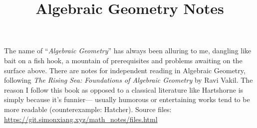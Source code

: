\documentclass[fontsize=9pt]{article}
\title{Algebraic Geometry Notes}
\begin{document}
\maketitle
The name of ``\emph{Algebraic Geometry}'' has always been alluring to me, dangling like bait on a fish hook, a mountain of prerequisites and problems awaiting on the surface above. There are notes for independent reading in Algebraic Geometry, following \emph{The Rising Sea: Foundations of Algebraic Geometry} by Ravi Vakil. The reason I follow this book as opposed to a classical literature like Hartshorne is simply because it's funnier— usually humorous or entertaining works tend to be more readable (counterexample: Hatcher). Source files: \url{https://git.simonxiang.xyz/math_notes/files.html}

\tableofcontents
    
\end{document}
